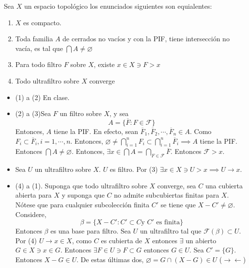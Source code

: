 \begin{teorema}
    Sea $X$ un espacio topológico los enunciados siguientes son equialentes: 
    \begin{enumerate}
        \item $X$ es compacto.
        \item Toda familia $A$ de cerrados no vacíos y con la PIF, tiene intersección no vacía, es tal que $\bigcap A\neq\varnothing$
        \item Para todo filtro $F$ sobre $X$, existe $x\in X\ni F>x$
        \item Todo ultrafiltro sobre $X$ converge 
    \end{enumerate}


    \begin{sol}
        \begin{itemize}
            \item (1) a (2) En clase. 
            \item (2) a (3)Sea $F$ un filtro sobre $X$, y sea $$A=\{\overline{F}: F\in \mathcal{F}\}$$
            Entonces, $A$ tiene la PIF. En efecto, sean $\overline{F}_1,\overline{F}_2,\cdots, \overline{F}_n\in A$. Como $F_i\subset \overline{F}_i,i=1,\cdots,n$. Entonces, $\varnothing\neq \bigcap_{i=1}^n F_i\subset \bigcap_{i=1}^n \overline{F}_i\implies A$ tiene la PIF. Entonces $\bigcap A\neq \varnothing$. Entonces, $\exists x\in \bigcap A=\bigcap_{F\in \mathcal{F}}\overline{F}$. Entonces $\mathcal{F}>x$. 
            \item Sea $U$ un ultrafiltro sobre $X$. $U$ es filtro. Por (3) $\exists x\in X\ni U>x\implies U\to x$.
            \item (4) a (1). Suponga que todo ultrafiltro sobre $X$ converge, sea $C$ una cubierta abierta para $X$ y suponga que $C$ no admite subcubiertas finitas para $X$. Nótese que para cualquier subcolección finita $C'$ se tiene que $X-C'\neq \varnothing$. Considere, $$\beta=\{X-C':C'\subset C \text{y $C'$ es finita}\}$$
            Entonces 
            $\beta$ es una base para filtro. Sea $U$ un ultrafiltro tal que $\mathcal{F}(\beta)\subset U$. Por (4) $U\to x\in X$, como $C$ es cubierta de $X$ entonces $\exists$ un abierto $G\in X\ni x\in G$. Entonces $\exists F\in U\ni F\subset G$ entonces $G\in U$. Sea $C'=\{G\}$. Entonces $X-G\in U$. De estas últimas dos, $\varnothing =G\cap (X-G)\in U$ ($\to\gets$)
        \end{itemize}
    \end{sol}
\end{teorema}

